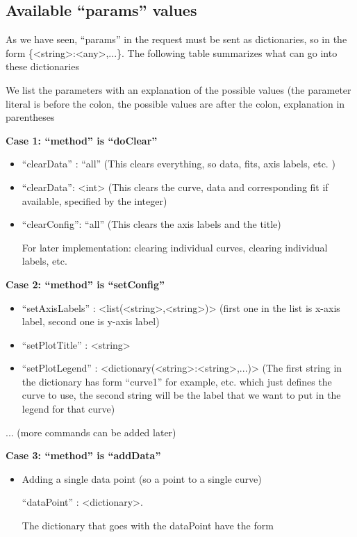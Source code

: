 \documentclass[11pt]{article} %
\begin{document}
\subsection{Available ``params'' values}

As we have seen, ``params'' in the request must be sent as dictionaries, so in the form \{<string>:<any>,...\}. The following table summarizes what can go into these dictionaries

\begin{tcolorbox}[breakable,title=Sending ``params'' to the server]

We list the parameters with an explanation of the possible values (the parameter literal is before the colon, the possible values are after the colon, explanation in parentheses

\textbf{Case 1: ``method'' is ``doClear''}
\begin{itemize}
\item ``clearData'' : ``all'' (This clears everything, so data, fits, axis labels, etc. )
\item ``clearData'': <int> (This clears the curve, data and corresponding fit if available, specified by the integer)
\item ``clearConfig'': ``all'' (This clears the axis labels and the title)

For later implementation: clearing individual curves, clearing individual labels, etc.
\end{itemize}
\textbf{Case 2: ``method'' is ``setConfig''}
\begin{itemize}
\item ``setAxisLabels'' : <list(<string>,<string>)> (first one in the list is x-axis label, second one is y-axis label)
\item ``setPlotTitle'' : <string>
\item ``setPlotLegend'' : <dictionary(<string>:<string>,...)> (The first string in the dictionary has form ``curve1'' for example, etc. which just defines the curve to use, the second string will be the label that we want to put in the legend for that curve)
\end{itemize}
	... (more commands can be added later)

\textbf{Case 3: ``method'' is ``addData''}
\begin{itemize}
\item Adding a single data point (so a point to a single curve)

``dataPoint'' : <dictionary>. 

The dictionary that goes with the dataPoint have the form


\end{itemize}
\end{tcolorbox}
\end{document}
